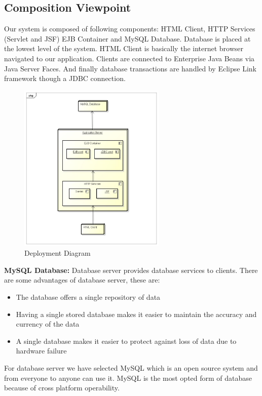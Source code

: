 \subsection{Composition Viewpoint}
\qquad Our system is composed of following components: HTML Client, HTTP Services (Servlet and JSF) EJB Container and MySQL Database. Database is placed at the lowest level of the system. HTML Client is basically the internet browser navigated to our application. Clients are connected to Enterprise Java Beans via Java Server Faces. And finally database transactions are handled by Eclipse Link framework though a JDBC connection.

\begin{figure}[tbh]
  \begin{center}
  \includegraphics[width=70mm]{deployd}
    \caption{Deployment Diagram}\label{Fig 1:}
  \end{center}
\end{figure}
\qquad\textbf{MySQL Database:} Database server provides database services to clients. There are some advantages of database server, these are:
\begin{itemize}
  \setlength{\itemsep}{1pt}
    \setlength{\parskip}{1pt}
  \item	The database offers a single repository of data
  \item	Having a single stored database makes it easier to maintain the accuracy and currency of the data
  \item A single database makes it easier to protect against loss of data due to hardware failure
\end{itemize}
\qquad For database server we have selected MySQL which is an open source system and from everyone to anyone can use it. MySQL is the most opted form of database because of cross platform operability.

